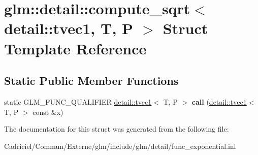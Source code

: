 \hypertarget{structglm_1_1detail_1_1compute__sqrt_3_01detail_1_1tvec1_00_01_t_00_01_p_01_4}{}\section{glm\+:\+:detail\+:\+:compute\+\_\+sqrt$<$ detail\+:\+:tvec1, T, P $>$ Struct Template Reference}
\label{structglm_1_1detail_1_1compute__sqrt_3_01detail_1_1tvec1_00_01_t_00_01_p_01_4}
\subsection*{Static Public Member Functions}
\begin{DoxyCompactItemize}
\item 
static G\+L\+M\+\_\+\+F\+U\+N\+C\+\_\+\+Q\+U\+A\+L\+I\+F\+I\+ER \hyperlink{structglm_1_1detail_1_1tvec1}{detail\+::tvec1}$<$ T, P $>$ {\bfseries call} (\hyperlink{structglm_1_1detail_1_1tvec1}{detail\+::tvec1}$<$ T, P $>$ const \&x)\hypertarget{structglm_1_1detail_1_1compute__sqrt_3_01detail_1_1tvec1_00_01_t_00_01_p_01_4_a19be057111b1a9d9459f75355ac256f5}{}\label{structglm_1_1detail_1_1compute__sqrt_3_01detail_1_1tvec1_00_01_t_00_01_p_01_4_a19be057111b1a9d9459f75355ac256f5}

\end{DoxyCompactItemize}


The documentation for this struct was generated from the following file\+:\begin{DoxyCompactItemize}
\item 
Cadriciel/\+Commun/\+Externe/glm/include/glm/detail/func\+\_\+exponential.\+inl\end{DoxyCompactItemize}
